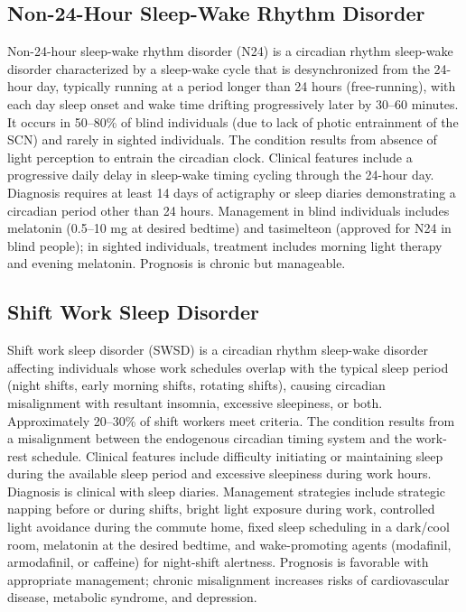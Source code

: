 \subsection{Non-24-Hour Sleep-Wake Rhythm Disorder}
\label{sec:Non-24-Hour Sleep-Wake Rhythm Disorder}
Non-24-hour sleep-wake rhythm disorder (N24) is a circadian rhythm sleep-wake disorder characterized by a sleep-wake cycle that is desynchronized from the 24-hour day, typically running at a period longer than 24 hours (free-running), with each day sleep onset and wake time drifting progressively later by 30--60 minutes. It occurs in 50--80\% of blind individuals (due to lack of photic entrainment of the SCN) and rarely in sighted individuals. The condition results from absence of light perception to entrain the circadian clock. Clinical features include a progressive daily delay in sleep-wake timing cycling through the 24-hour day. Diagnosis requires at least 14 days of actigraphy or sleep diaries demonstrating a circadian period other than 24 hours. Management in blind individuals includes melatonin (0.5--10 mg at desired bedtime) and tasimelteon (approved for N24 in blind people); in sighted individuals, treatment includes morning light therapy and evening melatonin. Prognosis is chronic but manageable.

\subsection{Shift Work Sleep Disorder}
\label{sec:Shift Work Sleep Disorder}
Shift work sleep disorder (SWSD) is a circadian rhythm sleep-wake disorder affecting individuals whose work schedules overlap with the typical sleep period (night shifts, early morning shifts, rotating shifts), causing circadian misalignment with resultant insomnia, excessive sleepiness, or both. Approximately 20--30\% of shift workers meet criteria. The condition results from a misalignment between the endogenous circadian timing system and the work-rest schedule. Clinical features include difficulty initiating or maintaining sleep during the available sleep period and excessive sleepiness during work hours. Diagnosis is clinical with sleep diaries. Management strategies include strategic napping before or during shifts, bright light exposure during work, controlled light avoidance during the commute home, fixed sleep scheduling in a dark/cool room, melatonin at the desired bedtime, and wake-promoting agents (modafinil, armodafinil, or caffeine) for night-shift alertness. Prognosis is favorable with appropriate management; chronic misalignment increases risks of cardiovascular disease, metabolic syndrome, and depression.

